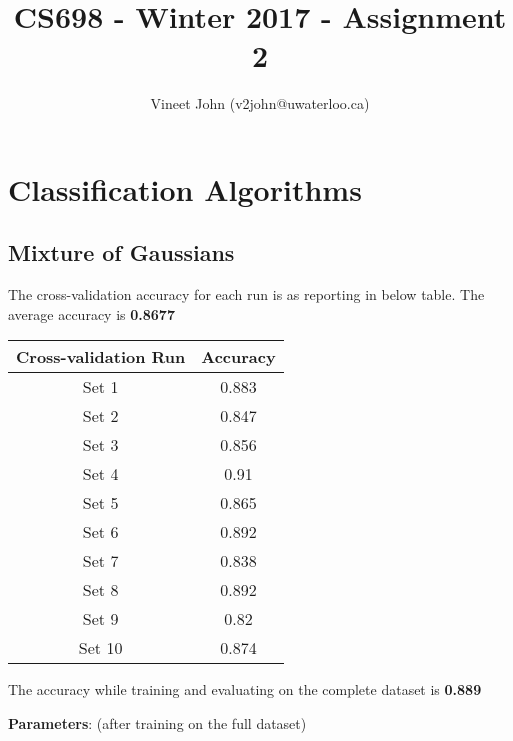 \documentclass[a4paper]{article}
\title{CS698 - Winter 2017 - Assignment 2}
\author{Vineet John (v2john@uwaterloo.ca)}
\date{}
\begin{document}
\maketitle

\renewcommand\thesubsection{\alph{subsection}}

\section{Classification Algorithms}

\subsection{Mixture of Gaussians}
The cross-validation accuracy for each run is as reporting in below table. The average accuracy is \textbf{0.8677}

\begin{center} 
	\begin{tabular}{ |c|c| } 
		\hline
		\textbf{Cross-validation Run} & \textbf{Accuracy} \\
		\hline
		\hline
		Set 1  & 0.883 \\
		\hline
		Set 2  & 0.847 \\
		\hline
		Set 3  & 0.856 \\
		\hline
		Set 4  & 0.91 \\
		\hline
		Set 5  & 0.865 \\
		\hline
		Set 6  & 0.892 \\
		\hline
		Set 7  & 0.838 \\
		\hline
		Set 8  & 0.892 \\
		\hline
		Set 9  & 0.82 \\
		\hline
		Set 10 & 0.874 \\
		\hline
	\end{tabular}
\end{center}

The accuracy while training and evaluating on the complete dataset is \textbf{0.889}

\vspace{5mm}

\textbf{Parameters}: (after training on the full dataset)

\vspace{5mm}
\end{document}

